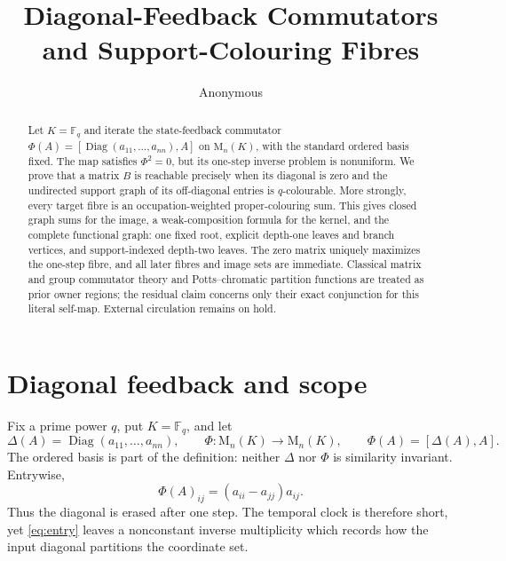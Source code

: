 \documentclass[a4paper,10pt]{amsart}
\title[Diagonal-feedback commutators]{Diagonal-Feedback Commutators and Support-Colouring Fibres}
\author{Anonymous}
\date{}
\theoremstyle{remark}
\newcommand{\F}{\mathbb F}
\newcommand{\Mat}{\mathrm M}
\newcommand{\Diag}{\operatorname{Diag}}
\begin{document}
\begin{abstract}
Let $K=\F_q$ and iterate the state-feedback commutator
$\Phi(A)=[\Diag(a_{11},\ldots,a_{nn}),A]$ on $\Mat_n(K)$, with the
standard ordered basis fixed.  The map satisfies $\Phi^2=0$, but its
one-step inverse problem is nonuniform.  We prove that a matrix $B$ is
reachable precisely when its diagonal is zero and the undirected support
graph of its off-diagonal entries is $q$-colourable.  More strongly, every
target fibre is an occupation-weighted proper-colouring sum.  This gives
closed graph sums for the image, a weak-composition formula for the kernel,
and the complete functional graph: one fixed root, explicit depth-one
leaves and branch vertices, and support-indexed depth-two leaves.  The zero
matrix uniquely maximizes the one-step fibre, and all later fibres and image
sets are immediate.  Classical matrix and group commutator theory and
Potts--chromatic partition functions are treated as prior owner regions;
the residual claim concerns only their exact conjunction for this literal
self-map.  External circulation remains on hold.
\end{abstract}

\maketitle

\section{Diagonal feedback and scope}

Fix a prime power $q$, put $K=\F_q$, and let
\begin{equation}\label{eq:map}
 \Delta(A)=\Diag(a_{11},\ldots,a_{nn}),\qquad
 \Phi:\Mat_n(K)\longrightarrow\Mat_n(K),\qquad
 \Phi(A)=[\Delta(A),A].
\end{equation}
The ordered basis is part of the definition: neither $\Delta$ nor $\Phi$ is
similarity invariant.  Entrywise,
\begin{equation}\label{eq:entry}
 \Phi(A)_{ij}=(a_{ii}-a_{jj})a_{ij}.
\end{equation}
Thus the diagonal is erased after one step.  The temporal clock is therefore
short, yet \eqref{eq:entry} leaves a nonconstant inverse multiplicity which
records how the input diagonal partitions the coordinate set.
\end{document}
